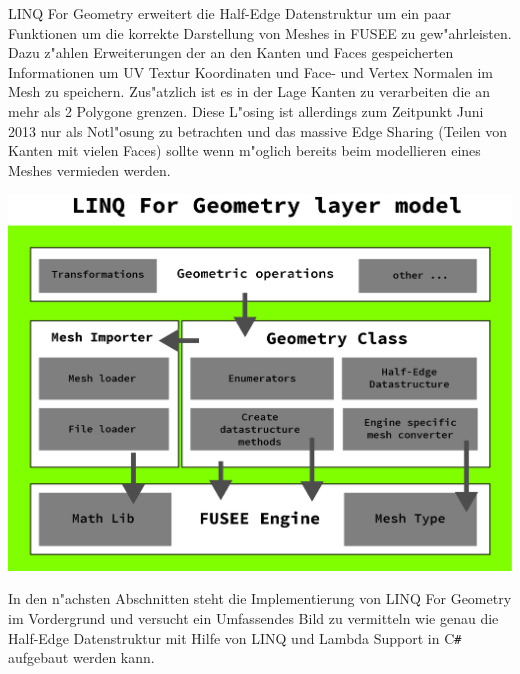 \documentclass[pagesize, paper=a4, fontsize=12pt,titlepage=true, headings=small, headnosepline, abstractoff, liststotoc, nochapterprefix, plainheadsepline]{scrreprt}
\newcommand{\CSS}{C\texttt{\# }}
\newcommand{\LFGS}{LINQ For Geometry }
\newcommand{\HES}{Half-Edge Datenstruktur }
\begin{document}
\LFGS erweitert die \HES um ein paar Funktionen um die korrekte Darstellung von Meshes in FUSEE zu gew"ahrleisten. Dazu z"ahlen Erweiterungen der an den Kanten und Faces gespeicherten Informationen um UV Textur Koordinaten und Face- und Vertex Normalen im Mesh zu speichern.
Zus"atzlich ist es in der Lage Kanten zu verarbeiten die an mehr als 2 Polygone grenzen. Diese L"osing ist allerdings zum Zeitpunkt Juni 2013 nur als Notl"osung zu betrachten und das massive Edge Sharing (Teilen von Kanten mit vielen Faces) sollte wenn m"oglich bereits beim modellieren eines Meshes vermieden werden.
\newline

\includegraphics[width=\linewidth]{../Bilder/LFGLayer}
\label{pic:LFGLayer} 


In den n"achsten Abschnitten steht die Implementierung von \LFGS im Vordergrund und versucht ein Umfassendes Bild zu vermitteln wie genau die \HES mit Hilfe von LINQ und Lambda Support in \CSS aufgebaut werden kann.
\newline
\end{document}
